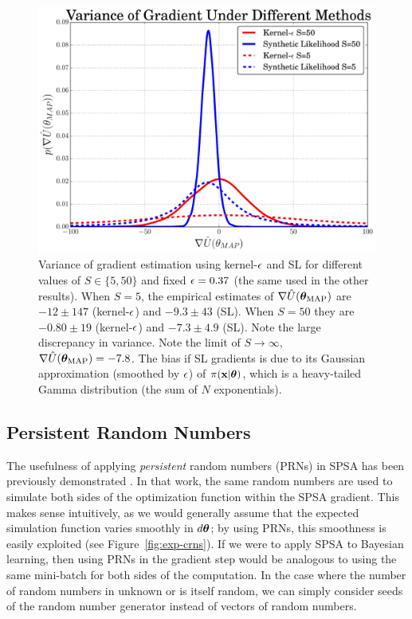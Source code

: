 \documentclass[]{article}
\begin{document}
\begin{figure}[t]
\vskip 0.2in
\begin{center}
\includegraphics[width=0.75\columnwidth]{./images/exp_varg_figure.pdf}
\vspace{-0.1in}
\caption{\small{Variance of gradient estimation using kernel-$\epsilon$ and SL for different values of $S\in\{5,50\}$ and fixed $\epsilon = 0.37$ (the same used in the other results).  
%
When $S=5$, the empirical estimates of  $\nabla \hat{U}({\bm \theta}_{\text{MAP}})$ are $-12 \pm 147$ (kernel-$\epsilon$) and $-9.3 \pm 43$ (SL).  When $S=50$ they are $-0.80 \pm 19$ (kernel-$\epsilon$) and $-7.3 \pm 4.9$ (SL).  Note the large discrepancy in variance.  Note the limit of $S \rightarrow \infty$,   $\nabla \hat{U}({\bm \theta}_{\text{MAP}}) = -7.8$.  The bias if SL gradients is due to its Gaussian approximation (smoothed by $\epsilon$) of $\pi({\bf x}|{\bm \theta})$, which is a heavy-tailed Gamma distribution (the sum of $N$ exponentials).}}
\label{fig:exp-varg}
\end{center}
\vspace{-0.2in}
\end{figure}

\subsection{Persistent Random Numbers}
The usefulness of applying {\em persistent} random numbers (PRNs) in SPSA has been previously demonstrated \cite{kleinman1999simulation}.  In that work, the same random numbers are used to simulate both sides of the optimization function within the SPSA gradient.  This makes sense intuitively, as we would generally assume that the expected simulation function varies smoothly in $d {\bm \theta}$;  by using PRNs, this smoothness is easily exploited (see Figure~\ref{fig:exp-crns}).  If we were to apply SPSA to Bayesian learning, then using PRNs in the gradient step would be analogous to using the same mini-batch for both sides of the computation.  In the case where the number of random numbers in unknown or is itself random, we can simply consider seeds of the random number generator instead of vectors of random numbers.
\end{document}

